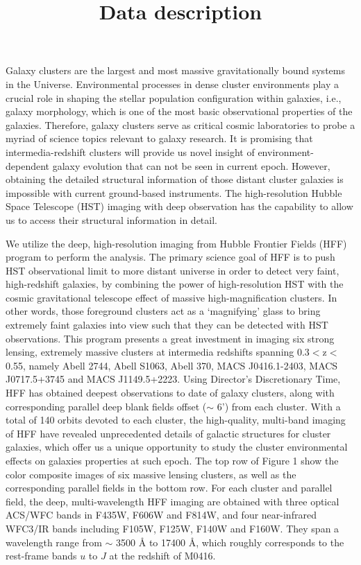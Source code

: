 \documentclass[12pt]{article}
\title{ \bf \huge Data description}
\date{}
\begin{document}
\maketitle

Galaxy clusters are the largest and most massive gravitationally bound systems in the Universe.
Environmental processes in dense cluster environments  play a crucial role in shaping the stellar population configuration within galaxies, i.e., galaxy morphology, which is one of the most basic observational properties of the galaxies.
Therefore, galaxy clusters serve as critical cosmic laboratories to probe a myriad of science topics relevant to galaxy research.
It is promising that intermedia-redshift clusters will provide us novel insight of environment- dependent galaxy evolution that can not be seen in current epoch.
However, obtaining the detailed structural information of those distant cluster galaxies is impossible with current ground-based instruments.
The high-resolution Hubble Space Telescope (HST) imaging with deep observation has the capability to allow us to access their structural information in detail.

We utilize the deep, high-resolution imaging  from Hubble Frontier Fields (HFF) program to perform the analysis.
The primary science goal of HFF is to push HST observational limit to more distant universe in order to detect very faint, high-redshift galaxies, by combining the power of high-resolution HST with the cosmic gravitational telescope effect of massive high-magnification clusters. In other words, those foreground clusters act as a `magnifying' glass to bring extremely faint galaxies into view such that they can be detected with HST observations.
This program presents a great investment in imaging six strong lensing, extremely massive clusters at intermedia redshifts spanning 0.3$<$z$<$0.55, namely Abell 2744, Abell S1063, Abell 370, MACS J0416.1-2403, MACS J0717.5+3745 and MACS J1149.5+2223. 
Using Director's Discretionary Time, HFF has obtained deepest observations to date of galaxy clusters, along with corresponding parallel deep blank fields offset ($\sim$ 6') from each cluster.
With a total of 140 orbits devoted to each cluster, the high-quality,  multi-band imaging of HFF have revealed unprecedented details of galactic structures for cluster galaxies, which offer us a unique opportunity to study the cluster environmental effects on galaxies properties at such epoch. 
The top row of Figure 1 show the color composite images of six massive lensing clusters, as well as the corresponding parallel fields in the bottom row.
For each cluster and parallel field, the deep, multi-wavelength HFF imaging are obtained with three optical ACS/WFC bands in F435W, F606W and F814W, and four near-infrared WFC3/IR bands including F105W, F125W, F140W and F160W.
They span a wavelength range from $\sim$ 3500 {\AA} to 17400 {\AA}, which roughly corresponds to the rest-frame bands $u$ to $J$ at the redshift of M0416.
\end{document}
